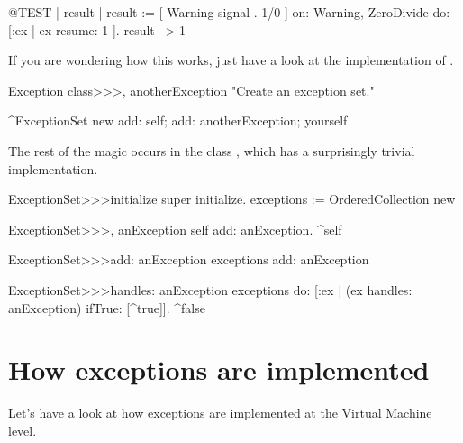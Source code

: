 \documentclass[a4paper,10pt,twoside]{book}
\begin{document}
\begin{code}{@TEST | result |}
result := [ Warning signal . 1/0 ]
	on: Warning, ZeroDivide
	do: [:ex | ex resume: 1 ].
result --> 1
\end{code}

If you are wondering how this works, just have a look at the implementation of .

\begin{code}{}
Exception class>>>, anotherException
	"Create an exception set."

	^ExceptionSet new
		add: self;
		add: anotherException;
		yourself
\end{code}

The rest of the magic occurs in the class , which has a surprisingly trivial implementation.

\begin{code}{}
ExceptionSet>>>initialize
	super initialize.
	exceptions := OrderedCollection new

ExceptionSet>>>, anException
	self add: anException.
	^self

ExceptionSet>>>add: anException
	exceptions add: anException

ExceptionSet>>>handles: anException
	exceptions do: [:ex | (ex handles: anException) ifTrue: [^true]].
	^false
\end{code}


\section{How exceptions are implemented}


Let's have a look at how exceptions are implemented at the Virtual Machine level.


\end{document}
